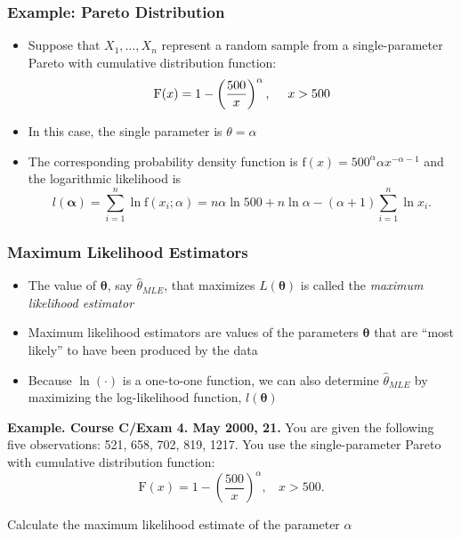 \documentclass{beamer}
\begin{document}
\begin{frame}[shrink=2]
\frametitle{Example: Pareto Distribution}
\begin{itemize}
\item Suppose that $X_1, \ldots, X_n$ represent a random sample from a single-parameter Pareto with cumulative distribution function:
\begin{equation*}
\mathrm{F}(x) = 1- \left(\frac{500}{x}\right)^{\alpha}, ~~~~ x>500
\vspace{2mm}
\end{equation*}
\item In this case, the single parameter is $\theta = \alpha$ \vspace{2mm}

\item The corresponding probability density function is $\mathrm{f}(x) = 500^{\alpha} \alpha x^{-\alpha-1}$
and the logarithmic likelihood is
\begin{equation*}
l(\boldsymbol \alpha) = \sum_{i=1}^n \ln \mathrm{f}(x_i;\alpha) = n
\alpha \ln 500 +n \ln \alpha -(\alpha+1)  \sum_{i=1}^n \ln x_i .
\end{equation*}
\end{itemize}
\end{frame}

\begin{frame}[shrink=2]
\frametitle{Maximum Likelihood Estimators}
\begin{itemize}
\item The value of $\boldsymbol \theta$, say $\hat{\theta}_{MLE}$, that maximizes $L(\boldsymbol \theta)$ is called the\emph{ maximum likelihood
estimator} \vspace{2mm}

\item Maximum likelihood estimators are values of the parameters $\boldsymbol \theta$ that are ``most likely'' to have been produced by the
data \vspace{2mm}

\item Because $\ln(\cdot)$ is a one-to-one function, we can also determine $\hat{\theta}_{MLE}$ by maximizing the log-likelihood function, $l(\boldsymbol \theta)$
\end{itemize}

\bigskip

\noindent\textbf{Example. Course C/Exam 4. May 2000, 21.} You are
given the following five observations: 521, 658, 702, 819, 1217. You
use the single-parameter Pareto with cumulative distribution
function:
\begin{equation*}
\mathrm{F}(x) = 1- \left(\frac{500}{x}\right)^{\alpha}, ~~~~ x>500 .
\end{equation*} \vspace{2mm}

Calculate the maximum likelihood estimate of the parameter $\alpha$
\end{frame}
\end{document}
